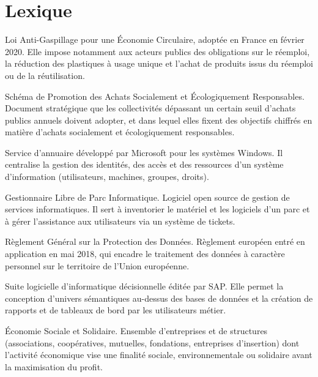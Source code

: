 \documentclass[11pt,a4paper]{article}
\begin{document}
\section*{Lexique}
\begin{description}[leftmargin=2.2em,style=nextline,itemsep=4pt]
\item[\hypertarget{lex:1}{}\textsuperscript{1} Loi AGEC] Loi Anti-Gaspillage pour une Économie Circulaire, adoptée en France en février 2020. Elle impose notamment aux acteurs publics des obligations sur le réemploi, la réduction des plastiques à usage unique et l'achat de produits issus du réemploi ou de la réutilisation.
\item[\hypertarget{lex:2}{}\textsuperscript{2} SPASER] Schéma de Promotion des Achats Socialement et Écologiquement Responsables. Document stratégique que les collectivités dépassant un certain seuil d'achats publics annuels doivent adopter, et dans lequel elles fixent des objectifs chiffrés en matière d'achats socialement et écologiquement responsables.
\item[\hypertarget{lex:3}{}\textsuperscript{3} Active Directory (AD)] Service d'annuaire développé par Microsoft pour les systèmes Windows. Il centralise la gestion des identités, des accès et des ressources d'un système d'information (utilisateurs, machines, groupes, droits).
\item[\hypertarget{lex:4}{}\textsuperscript{4} GLPI] Gestionnaire Libre de Parc Informatique. Logiciel open source de gestion de services informatiques. Il sert à inventorier le matériel et les logiciels d'un parc et à gérer l'assistance aux utilisateurs via un système de tickets.
\item[\hypertarget{lex:5}{}\textsuperscript{5} RGPD] Règlement Général sur la Protection des Données. Règlement européen entré en application en mai 2018, qui encadre le traitement des données à caractère personnel sur le territoire de l'Union européenne.
\item[\hypertarget{lex:6}{}\textsuperscript{6} BusinessObjects (BO)] Suite logicielle d'informatique décisionnelle éditée par SAP. Elle permet la conception d'univers sémantiques au-dessus des bases de données et la création de rapports et de tableaux de bord par les utilisateurs métier.
\item[\hypertarget{lex:7}{}\textsuperscript{7} ESS] Économie Sociale et Solidaire. Ensemble d'entreprises et de structures (associations, coopératives, mutuelles, fondations, entreprises d'insertion) dont l'activité économique vise une finalité sociale, environnementale ou solidaire avant la maximisation du profit.

\end{description}
\end{document}

